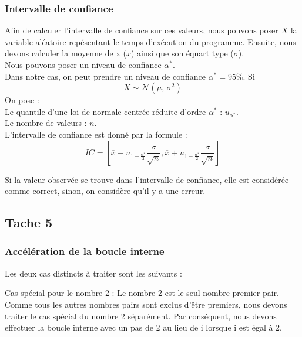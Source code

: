 \documentclass[
    ]{article}
\begin{document}
\hypertarget{intervalle-de-confiance}{%
\subsubsection{Intervalle de confiance}\label{intervalle-de-confiance}}

Afin de calculer l'intervalle de confiance sur ces valeurs, nous pouvons
poser \(X\) la variable aléatoire repésentant le temps d'exécution du
programme. Ensuite, nous devons calculer la moyenne de x
(\(\overline{x}\)) ainsi que son équart type (\(\sigma\)).\\
Nous pouvons poser un niveau de confiance \(\alpha^{*}\).\\
Dans notre cas, on peut prendre un niveau de confiance
\(\alpha^{*} = 95\)\%. Si \[X \sim \mathcal{N}(\mu,\,\sigma^{2})\] On
pose :\\
Le quantile d'une loi de normale centrée réduite d'ordre \(\alpha^{*}\)
: \(u_{\alpha^{*}}\).\\
Le nombre de valeurs : \(n\).\\
L'intervalle de confiance est donné par la formule :\\
\begin{equation}
IC = [\overline{x} - u_{1- \frac{\alpha^{*}}{2}} \frac{\sigma}{\sqrt{n}} , \overline{x} + u_{1- \frac{\alpha^{*}}{2}} \frac{\sigma}{\sqrt{n}} ]
\end{equation}

Si la valeur observée se trouve dans l'intervalle de confiance, elle est
considérée comme correct, sinon, on considère qu'il y a une erreur.

\pagebreak

\hypertarget{tache-5}{%
\subsection{Tache 5}\label{tache-5}}

\hypertarget{accuxe9luxe9ration-de-la-boucle-interne}{%
\subsubsection{Accélération de la boucle
interne}\label{accuxe9luxe9ration-de-la-boucle-interne}}

Les deux cas distincts à traiter sont les suivants :

Cas spécial pour le nombre 2 : Le nombre 2 est le seul nombre premier
pair. Comme tous les autres nombres pairs sont exclus d'être premiers,
nous devons traiter le cas spécial du nombre 2 séparément. Par
conséquent, nous devons effectuer la boucle interne avec un pas de 2 au
lieu de i lorsque i est égal à 2.
\end{document}
